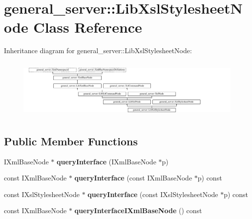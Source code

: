 \hypertarget{classgeneral__server_1_1LibXslStylesheetNode}{\section{general\-\_\-server\-:\-:\-Lib\-Xsl\-Stylesheet\-Node \-Class \-Reference}
\label{classgeneral__server_1_1LibXslStylesheetNode}
}
\-Inheritance diagram for general\-\_\-server\-:\-:\-Lib\-Xsl\-Stylesheet\-Node\-:\begin{figure}[H]
\begin{center}
\leavevmode
\includegraphics[height=2.989324cm]{classgeneral__server_1_1LibXslStylesheetNode}
\end{center}
\end{figure}
\subsection*{\-Public \-Member \-Functions}
\begin{DoxyCompactItemize}
\item 
\hypertarget{classgeneral__server_1_1LibXslStylesheetNode_a8d1de8e47d4d8eb4d2c2f5c0722a06d9}{\-I\-Xml\-Base\-Node $\ast$ {\bfseries query\-Interface} (\-I\-Xml\-Base\-Node $\ast$p)}\label{classgeneral__server_1_1LibXslStylesheetNode_a8d1de8e47d4d8eb4d2c2f5c0722a06d9}

\item 
\hypertarget{classgeneral__server_1_1LibXslStylesheetNode_abe270a7b8fef8c74a00a092c2380eebf}{const \-I\-Xml\-Base\-Node $\ast$ {\bfseries query\-Interface} (const \-I\-Xml\-Base\-Node $\ast$p) const }\label{classgeneral__server_1_1LibXslStylesheetNode_abe270a7b8fef8c74a00a092c2380eebf}

\item 
\hypertarget{classgeneral__server_1_1LibXslStylesheetNode_a3431d5befbf12aa1565572963de95618}{const \-I\-Xsl\-Stylesheet\-Node $\ast$ {\bfseries query\-Interface} (const \-I\-Xsl\-Stylesheet\-Node $\ast$p) const }\label{classgeneral__server_1_1LibXslStylesheetNode_a3431d5befbf12aa1565572963de95618}

\item 
\hypertarget{classgeneral__server_1_1LibXslStylesheetNode_a5acbefcbab73afde59a2f09ca4863eda}{const \-I\-Xml\-Base\-Node $\ast$ {\bfseries query\-Interface\-I\-Xml\-Base\-Node} () const }\label{classgeneral__server_1_1LibXslStylesheetNode_a5acbefcbab73afde59a2f09ca4863eda}

\end{DoxyCompactItemize}
